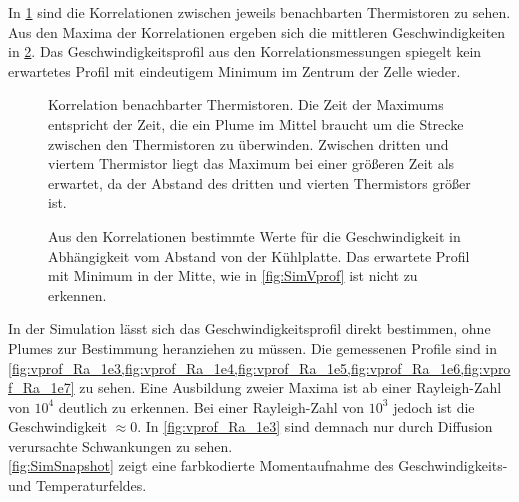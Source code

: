 In \cref{fig:korr} sind die Korrelationen zwischen jeweils benachbarten Thermistoren zu sehen. Aus den Maxima der Korrelationen ergeben sich die mittleren Geschwindigkeiten in \cref{fig:v_korr}.
Das Geschwindigkeitsprofil aus den Korrelationsmessungen spiegelt kein erwartetes Profil mit eindeutigem Minimum im Zentrum der Zelle wieder.
\\
\begin{figure}
	\caption{Korrelation benachbarter Thermistoren. Die Zeit der Maximums entspricht der Zeit, die ein Plume im Mittel braucht um die Strecke zwischen den Thermistoren zu überwinden. Zwischen dritten und viertem Thermistor liegt das Maximum bei einer größeren Zeit als erwartet, da der Abstand des dritten und vierten Thermistors größer ist.}\label{fig:korr}
\end{figure}
\begin{figure}
	\caption{Aus den Korrelationen bestimmte Werte für die Geschwindigkeit in Abhängigkeit vom Abstand von der Kühlplatte. Das erwartete Profil mit Minimum in der Mitte, wie in \cref{fig:SimVprof} ist nicht zu erkennen.}\label{fig:v_korr}
\end{figure}
In der Simulation lässt sich das Geschwindigkeitsprofil direkt bestimmen, ohne Plumes zur Bestimmung heranziehen zu müssen.
Die gemessenen Profile sind in \cref{fig:vprof_Ra_1e3,fig:vprof_Ra_1e4,fig:vprof_Ra_1e5,fig:vprof_Ra_1e6,fig:vprof_Ra_1e7} zu sehen. 
Eine Ausbildung zweier Maxima ist ab einer Rayleigh-Zahl von $10^4$ deutlich zu erkennen. 
Bei einer Rayleigh-Zahl von $10^3$ jedoch ist die Geschwindigkeit $\approx 0$. 
In \cref{fig:vprof_Ra_1e3} sind demnach nur durch Diffusion verursachte Schwankungen zu sehen.
\\
\cref{fig:SimSnapshot} zeigt eine farbkodierte Momentaufnahme des Geschwindigkeits- und Temperaturfeldes. 
\\

\FloatBarrier

